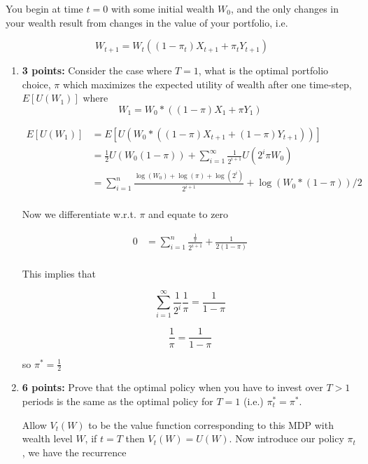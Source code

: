 \documentclass[12pt]{exam}
\begin{document}
\begin{questions}
You begin at time $t=0$ with some initial wealth $W_0$, and the only changes in your wealth result from changes in the value of your portfolio, i.e.

\[W_{t+1} = W_t((1-\pi_t)X_{t+1} + \pi_t Y_{t+1})\]

\begin{enumerate}
    \item {\bf 3 points:} Consider the case where $T=1$, what is the optimal portfolio choice, $\pi$ which maximizes the expected utility of wealth after one time-step, $E[U(W_{1})]$ where 
    \[W_{1} =  W_0*((1-\pi)X_{1} + \pi Y_{1})\]

\begin{solution}

\begin{align*}
    E[U(W_{1})] &= E[U(W_0*((1-\pi) X_{t+1} + (1-\pi)Y_{t+1}))] \\
    &= \frac{1}{2}U(W_0 (1-\pi)) + \sum_{i=1}^{\infty}\frac{1}{2^{i+1}}U(2^i \pi W_0)\\
    &= \sum_{i=1}^n \frac{\log(W_0) + \log(\pi) + \log(2^i)}{2^{i+1}} +  \log(W_0*(1-\pi))/2\\
\end{align*}

Now we differentiate w.r.t. $\pi$ and equate to zero

\begin{align*}
    0 &= \sum_{i=1}^n \frac{\frac{1}{\pi}}{2^{i+1}} +  \frac{1}{2(1-\pi)}\\
\end{align*}

This implies that 

\[\sum_{i=1}^{\infty} \frac{1}{2^{i}} \frac{1}{\pi} = \frac{1}{1-\pi}\]

\[\frac{1}{\pi} = \frac{1}{1-\pi}\]

so $\pi^* = \frac{1}{2}$

\end{solution}

    \item {\bf 6 points:} Prove that the optimal policy when you have to invest over $T > 1$ periods is the same as the optimal policy for $T=1$ (i.e.) $\pi_t^*=\pi^*$. 
    
\begin{solution}

Allow $V_{t}(W)$ to be the value function corresponding to this MDP with wealth level $W$, if $t=T$ then $V_{t}(W)=U(W)$. Now introduce our policy $\pi_t$, we have the recurrence 


\end{solution}
\end{enumerate}
\end{questions}
\end{document}
